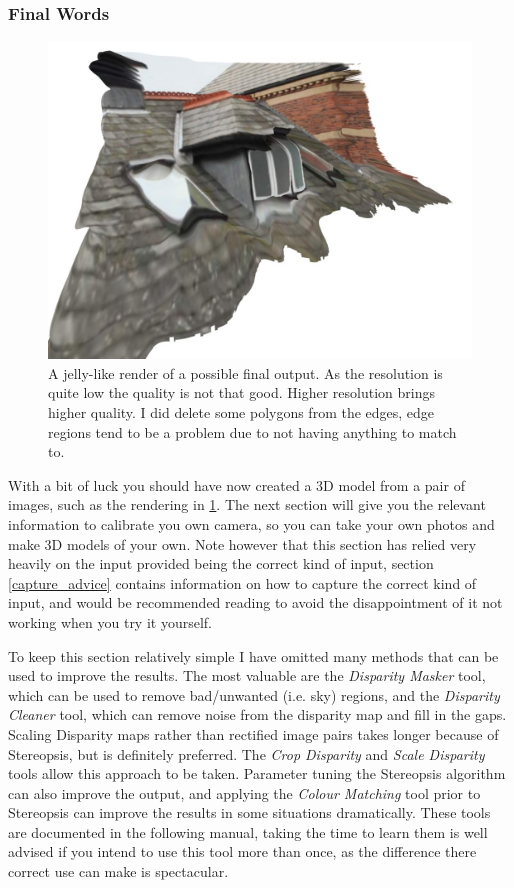 \documentclass[10pt,a4paper,twoside]{article}
\begin{document}
\subsubsection {Final Words}

\begin{figure}
 \centering
 \includegraphics[width=1.0\textwidth]{screenshots/dense_render}
 \caption{A jelly-like render of a possible final output. As the resolution is quite low the quality is not that good. Higher resolution brings higher quality. I did delete some polygons from the edges, edge regions tend to be a problem due to not having anything to match to.}
 \label{fig:dense_render}
\end{figure}

With a bit of luck you should have now created a 3D model from a pair of images, such as the rendering in \ref{fig:dense_render}. The next section will give you the relevant information to calibrate you own camera, so you can take your own photos and make 3D models of your own. Note however that this section has relied very heavily on the input provided being the correct kind of input, section \ref{capture_advice} contains information on how to capture the correct kind of input, and would be recommended reading to avoid the disappointment of it not working when you try it yourself.

To keep this section relatively simple I have omitted many methods that can be used to improve the results.
The most valuable are the \emph{Disparity Masker} tool, which can be used to remove bad/unwanted (i.e. sky) regions, and the \emph{Disparity Cleaner} tool, which can remove noise from the disparity map and fill in the gaps.
Scaling Disparity maps rather than rectified image pairs takes longer because of Stereopsis, but is definitely preferred.
The \emph{Crop Disparity} and \emph{Scale Disparity} tools allow this approach to be taken.
Parameter tuning the Stereopsis algorithm can also improve the output, and applying the \emph{Colour Matching} tool prior to Stereopsis can improve the results in some situations dramatically.
These tools are documented in the following manual, taking the time to learn them is well advised if you intend to use this tool more than once, as the difference there correct use can make is spectacular.
\end{document}
